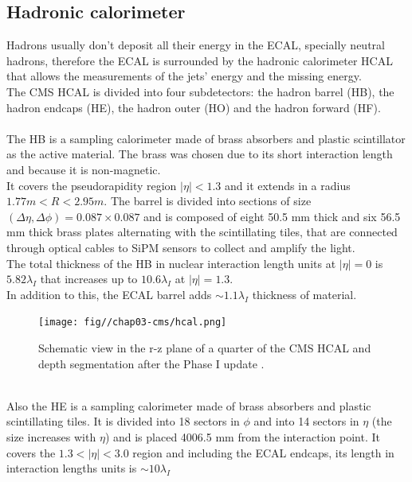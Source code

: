\subsection{Hadronic calorimeter}
Hadrons usually don't deposit all their energy in the ECAL, specially neutral hadrons, therefore the ECAL is surrounded by the hadronic calorimeter HCAL that allows the measurements of the jets' energy and the missing energy.\\
The CMS HCAL \cite{Green1997TheReport,Anderson2012CMSCalorimeter} is divided into four subdetectors: the hadron barrel (HB), the hadron endcaps (HE), the hadron outer (HO) and the hadron forward (HF).\\
\\
The HB is a sampling calorimeter made of brass absorbers and plastic scintillator as the active material. The brass was chosen due to its short interaction length and because it is non-magnetic.\\
It covers the pseudorapidity  region $|\eta|<1.3$ and it extends in a radius $1.77m<R<2.95m$. The barrel is divided into sections of size $(\Delta \eta, \Delta \phi)=0.087 \times 0.087$ and is composed of eight 50.5 mm thick and six 56.5 mm thick brass plates alternating with the scintillating tiles, that are connected through optical cables to SiPM sensors to collect and amplify the light.\\
The total thickness of the HB in nuclear interaction length units at $|\eta|=0$ is $5.82 \lambda_I$ that increases up to $10.6\lambda_I$ at $|\eta|=1.3$.\\
In addition to this, the ECAL barrel adds $\sim 1.1\lambda_I$ thickness of material.\\
\begin{figure}[h!]
    \centering
    \texttt{[image: fig//chap03-cms/hcal.png]}
    \caption{Schematic view in the r-z plane of a quarter of the CMS HCAL and depth segmentation after the Phase I update \cite{Anderson2012CMSCalorimeter}. }
    \label{fig:hcal}
\end{figure}
\\
Also the HE is a sampling calorimeter made of brass absorbers and plastic scintillating tiles. It is divided into 18 sectors in $\phi$ and into 14 sectors in $\eta$ (the size increases with $\eta$) and is placed 4006.5 mm from the interaction point. It covers the $1.3 < |\eta|<3.0$ region and including the ECAL endcaps, its length in interaction lengths units is $\sim10\lambda_I$\\
\\
